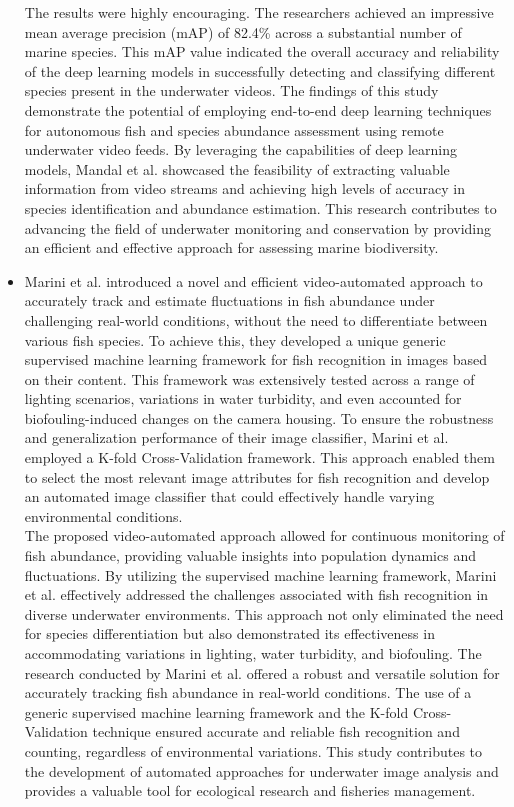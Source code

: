 \begin{itemize}
    The results were highly encouraging. The researchers achieved an impressive mean average precision (mAP) of 82.4\% across a substantial number of marine species. This mAP value indicated the overall accuracy and reliability of the deep learning models in successfully detecting and classifying different species present in the underwater videos. The findings of this study demonstrate the potential of employing end-to-end deep learning techniques for autonomous fish and species abundance assessment using remote underwater video feeds. By leveraging the capabilities of deep learning models, Mandal et al. showcased the feasibility of extracting valuable information from video streams and achieving high levels of accuracy in species identification and abundance estimation. This research contributes to advancing the field of underwater monitoring and conservation by providing an efficient and effective approach for assessing marine biodiversity.
    \item Marini et al. \cite{marini2018tracking} introduced a novel and efficient video-automated approach to accurately track and estimate fluctuations in fish abundance under challenging real-world conditions, without the need to differentiate between various fish species. To achieve this, they developed a unique generic supervised machine learning framework for fish recognition in images based on their content. This framework was extensively tested across a range of lighting scenarios, variations in water turbidity, and even accounted for biofouling-induced changes on the camera housing. To ensure the robustness and generalization performance of their image classifier, Marini et al. employed a K-fold Cross-Validation framework. This approach enabled them to select the most relevant image attributes for fish recognition and develop an automated image classifier that could effectively handle varying environmental conditions. \\
    The proposed video-automated approach allowed for continuous monitoring of fish abundance, providing valuable insights into population dynamics and fluctuations. By utilizing the supervised machine learning framework, Marini et al. effectively addressed the challenges associated with fish recognition in diverse underwater environments. This approach not only eliminated the need for species differentiation but also demonstrated its effectiveness in accommodating variations in lighting, water turbidity, and biofouling. The research conducted by Marini et al. offered a robust and versatile solution for accurately tracking fish abundance in real-world conditions. The use of a generic supervised machine learning framework and the K-fold Cross-Validation technique ensured accurate and reliable fish recognition and counting, regardless of environmental variations. This study contributes to the development of automated approaches for underwater image analysis and provides a valuable tool for ecological research and fisheries management.
\end{itemize} \\

